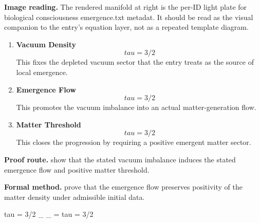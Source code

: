 \begin{samepage}
\noindent\begin{minipage}[t]{0.45\linewidth}
\vspace{0pt}
\raggedright
\scriptsize\textbf{Image reading.} The rendered manifold at right is the per-ID light plate for biological consciousness emergence.txt metadat. It should be read as the visual companion to the entry's equation layer, not as a repeated template diagram.\par
\end{minipage}\hfill
\begin{minipage}[t]{0.53\linewidth}
\vspace*{-0.10in}
\raggedright
{}
\end{minipage}
\end{samepage}

\clearpage


\begin{enumerate}[leftmargin=1.6em,itemsep=9pt,topsep=6pt]
\item \textbf{Vacuum Density}
\[
tau = 3/2
\]
This fixes the depleted vacuum sector that the entry treats as the source of local emergence.

\item \textbf{Emergence Flow}
\[
tau = 3/2
\]
This promotes the vacuum imbalance into an actual matter-generation flow.

\item \textbf{Matter Threshold}
\[
tau = 3/2
\]
This closes the progression by requiring a positive emergent matter sector.
\end{enumerate}

\textbf{Proof route.} show that the stated vacuum imbalance induces the stated emergence flow and positive matter threshold.

\textbf{Formal method.} prove that the emergence flow preserves positivity of the matter density under admissible initial data.

\medskip
{}

\begin{tzpsnapshot}
\end{tzpsnapshot}

\tzpequationlinks
  {tau = 3/2}
  {\partial_{} \rho_{} = \cdots}
  {tau = 3/2}
